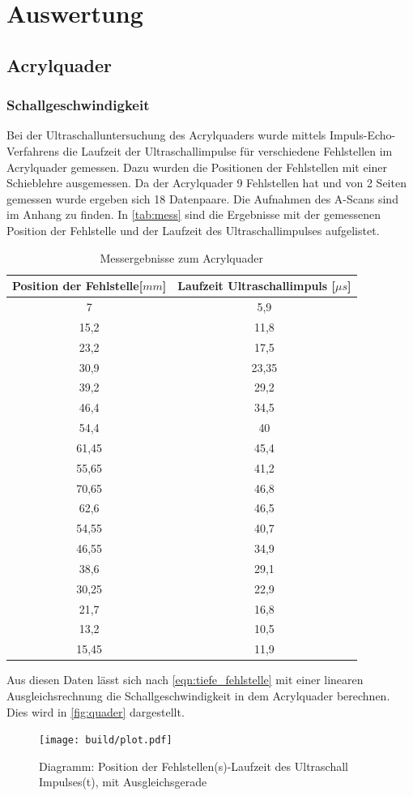\section{Auswertung}
\label{sec:Auswertung}
\subsection{Acrylquader}
\subsubsection{Schallgeschwindigkeit}
Bei der Ultraschalluntersuchung des Acrylquaders wurde mittels Impuls-Echo-Verfahrens die Laufzeit der Ultraschallimpulse für verschiedene Fehlstellen im Acrylquader gemessen. Dazu wurden die Positionen der Fehlstellen mit einer Schieblehre ausgemessen. Da der Acrylquader 9 Fehlstellen hat und von 2 Seiten gemessen wurde ergeben sich 18 Datenpaare. Die Aufnahmen des A-Scans sind im Anhang zu finden. In \autoref{tab:mess} sind die Ergebnisse mit der gemessenen Position der Fehlstelle und der Laufzeit des Ultraschallimpulses aufgelistet.
\begin{table}
  \centering
  \caption{Messergebnisse zum Acrylquader}
\label{tab:mess}
  \begin{tabular}{c c }
  \toprule
  Position der Fehlstelle[$mm$] & Laufzeit Ultraschallimpuls [$\mu s$]\\
  \midrule
  7 & 5,9 \\
  15,2 & 11,8 \\
  23,2 & 17,5 \\
  30,9 & 23,35 \\
  39,2 & 29,2 \\
  46,4 & 34,5 \\
  54,4 & 40 \\
  61,45 & 45,4 \\
  55,65 & 41,2 \\
  70,65 & 46,8 \\
  62,6 & 46,5 \\
  54,55 & 40,7 \\
  46,55 & 34,9 \\
  38,6 & 29,1 \\
  30,25 & 22,9 \\
  21,7 & 16,8 \\
  13,2 & 10,5 \\
  15,45 & 11,9 \\
  \bottomrule
  \end{tabular}
\end{table} 
\newpage
Aus diesen Daten lässt sich nach \autoref{eqn:tiefe_fehlstelle} mit einer linearen Ausgleichsrechnung die Schallgeschwindigkeit in dem Acrylquader berechnen. Dies wird in \autoref{fig:quader} dargestellt.
\begin{figure}[H]
  \centering
  \texttt{[image: build/plot.pdf]}
  \caption{Diagramm: Position der Fehlstellen(s)-Laufzeit des Ultraschall Impulses(t), mit Ausgleichsgerade}
  \label{fig:quader}
\end{figure}

